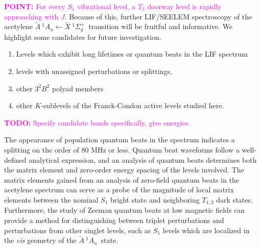 \documentclass[12pt]{mitthesis}
\newcommand{\TODO} [1]{\textcolor{magenta}{\textbf{TODO:} #1}}
\newcommand{\POINT}[1]{\textcolor{magenta}{\textbf{POINT:} #1}}
\newcommand{\astate}{$
  \tilde{A} \: ^1\!A_u
  $}
\newcommand{\AtoX}{$
  \tilde{A} \: ^1\!A_u 
  \leftarrow 
  \tilde{X} \: ^1\Sigma_g^+
  $}
\begin{document}
\POINT{For every $S_1$ vibrational level, a $T_3$ doorway level is
  rapidly approaching with $J$.}  Because of this, further LIF/SEELEM
spectroscopy of the acetylene \AtoX\ transition will be fruitful and
informative.  We highlight some candidates for future investigation.
\begin{enumerate}
\item Levels which exhibit long lifetimes or quantum beats in the LIF
  spectrum
\item levels with unassigned perturbations or splittings,
\item other $3^2B^2$ polyad members
\item other $K$-sublevels of the Franck-Condon active levels studied
  here.  
\end{enumerate}
\TODO{Specify candidate bands specifically, give energies.}

The appearance of population quantum beats in the spectrum indicates a
splitting on the order of 80 MHz or less.  Quantum beat waveforms
follow a well-defined analytical expression, and an analysis of
quantum beats determines both the matrix element and zero-order energy
spacing of the levels involved.  The matrix elements gained from an
analysis of zero-field quantum beats in the acetylene spectrum can
serve as a probe of the magnitude of local matrix elements between the
nominal $S_1$ bright state and neighboring $T_{1,2}$ dark states.
Furthermore, the study of Zeeman quantum beats at low magnetic fields
can provide a method for distinguishing between triplet perturbations
and perturbations from other singlet levels, such as $S_1$ levels
which are localized in the \emph{cis} geometry of the \astate\ state.

 

\end{document}
